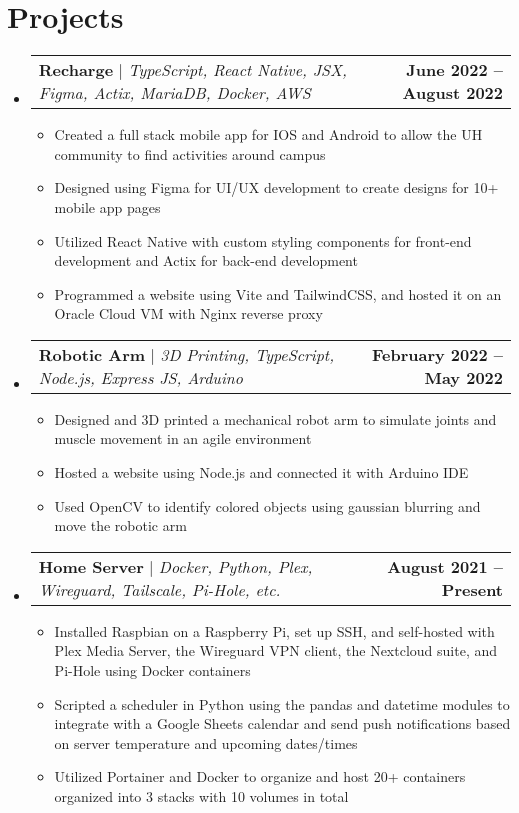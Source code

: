 \documentclass[letterpaper,11pt]{article}
\makeatletter
\newcommand{\resumeItem}[1]{
  \item\small{
    {#1 \vspace{-2pt}}
  }
}
\newcommand{\resumeProjectHeading}[2]{
    \item
    \begin{tabular*}{1.001\textwidth}{l@{\extracolsep{\fill}}r}
      \small#1 & \textbf{\small #2}\\
    \end{tabular*}\vspace{-7pt}
}
\newcommand{\resumeSubHeadingListStart}{\begin{itemize}[leftmargin=0.0in, label={}]}
\newcommand{\resumeSubHeadingListEnd}{\end{itemize}}
\newcommand{\resumeItemListStart}{\begin{itemize}}
\newcommand{\resumeItemListEnd}{\end{itemize}\vspace{-5pt}}
\makeatother
\begin{document}
\section{Projects}
    \vspace{-5pt}
    \resumeSubHeadingListStart
      \resumeProjectHeading
          {\textbf{Recharge} $|$ \emph{TypeScript, React Native, JSX, Figma, Actix, MariaDB, Docker, AWS}}{June 2022 -- August 2022}
          \resumeItemListStart
            \resumeItem{Created a full stack mobile app for IOS and Android to allow the UH community to find activities around campus}
            \resumeItem{Designed using Figma for UI/UX development to create designs for 10+ mobile app pages}
            \resumeItem{Utilized React Native with custom styling components for front-end development and Actix for back-end development}
            \resumeItem{Programmed a website using Vite and TailwindCSS, and hosted it on an Oracle Cloud VM with Nginx reverse proxy}
          \resumeItemListEnd
          \vspace{-13pt}
      \resumeProjectHeading
          {\textbf{Robotic Arm} $|$ \emph{3D Printing, TypeScript, Node.js, Express JS, Arduino}}{February 2022 -- May 2022}
          \resumeItemListStart
            \resumeItem{Designed and 3D printed a mechanical robot arm to simulate joints and muscle movement in an agile environment}
            \resumeItem{Hosted a website using Node.js and connected it with Arduino IDE}
            \resumeItem{Used OpenCV to identify colored objects using gaussian blurring and move the robotic arm}
          \resumeItemListEnd 
          \vspace{-13pt}
          \resumeProjectHeading
          {\textbf{Home Server} $|$ \emph{Docker, Python, Plex, Wireguard, Tailscale, Pi-Hole, etc.}}{August 2021 -- Present}
          \resumeItemListStart
            \resumeItem{Installed Raspbian on a Raspberry Pi, set up SSH, and self-hosted with Plex Media Server, the Wireguard VPN client, the Nextcloud suite, and Pi-Hole using Docker containers}
            \resumeItem{Scripted a scheduler in Python using the pandas and datetime modules to integrate with a Google Sheets calendar and send push notifications based on server temperature and upcoming dates/times}
            \resumeItem{Utilized Portainer and Docker to organize and host 20+ containers organized into 3 stacks with 10 volumes in total}
          \resumeItemListEnd 
    \resumeSubHeadingListEnd
\vspace{-15pt}


%
\end{document}
